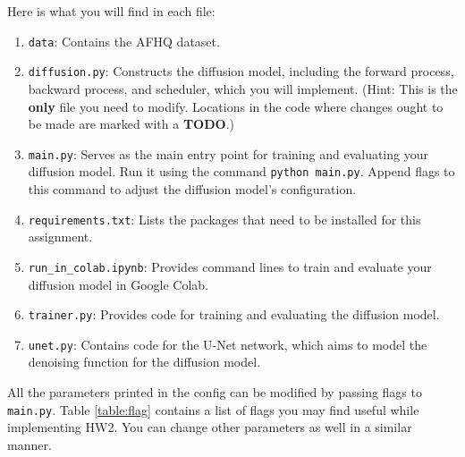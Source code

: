 \documentclass[11pt,addpoints,answers]{exam}
\begin{document}
\begin{questions}
Here is what you will find in each file:
\begin{enumerate}
    
    \item \lstinline{data}: Contains the AFHQ dataset.
    
    \item \lstinline{diffusion.py}: Constructs the diffusion model, including the forward process, backward process, and scheduler, which you will implement. (Hint: This is the \textbf{only} file you need to modify. Locations in the code where changes ought to be made are marked with a \textbf{TODO}.)

    \item \lstinline{main.py}: Serves as the main entry point for training and evaluating your diffusion model. Run it using the command \lstinline{python main.py}. Append flags to this command to adjust the diffusion model's configuration.
    
    \item \lstinline{requirements.txt}: Lists the packages that need to be installed for this assignment.
    
    \item \lstinline{run_in_colab.ipynb}: Provides command lines to train and evaluate your diffusion model in Google Colab.
    
    \item \lstinline{trainer.py}: Provides code for training and evaluating the diffusion model.
    
    \item \lstinline{unet.py}: Contains code for the U-Net network, which aims to model the denoising function for the diffusion model.
    
\end{enumerate}



All the parameters printed in the config can be modified by passing flags to \lstinline{main.py}. Table \ref{table:flag} contains a list of flags you may find useful while implementing HW2. You can change other parameters as well in a similar manner.


\end{questions}
\end{document}
